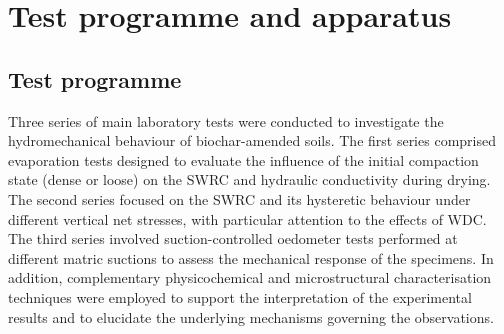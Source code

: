 \section{Test programme and apparatus}
\subsection{Test programme}
Three series of main laboratory tests were conducted to investigate the hydromechanical behaviour of biochar-amended soils. The first series comprised evaporation tests designed to evaluate the influence of the initial compaction state (dense or loose) on the \ac{SWRC} and hydraulic conductivity during drying. The second series focused on the \ac{SWRC} and its hysteretic behaviour under different vertical net stresses, with particular attention to the effects of \ac{WDC}. The third series involved suction-controlled oedometer tests performed at different matric suctions to assess the mechanical response of the specimens. In addition, complementary physicochemical and microstructural characterisation techniques were employed to support the interpretation of the experimental results and to elucidate the underlying mechanisms governing the observations.\par
